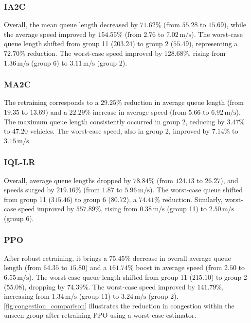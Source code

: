 \documentclass[lettersize,journal]{IEEEtran}
\begin{document}
\subsubsection{IA2C}
Overall, the mean queue length decreased by $71.62\%$ (from $55.28$ to $15.69$), while the average speed improved by $154.55\%$ (from $2.76$ to $7.02\,\mathrm{m/s}$). The worst-case queue length shifted from group 11 ($203.24$) to group 2 ($55.49$), representing a $72.70\%$ reduction. The worst-case speed improved by $128.68\%$, rising from $1.36\,\mathrm{m/s}$ (group 6) to $3.11\,\mathrm{m/s}$ (group 2).

\subsubsection{MA2C}
The retraining corresponds to a $29.25\%$ reduction in average queue length (from $19.35$ to $13.69$) and a $22.29\%$ increase in average speed (from $5.66$ to $6.92\,\mathrm{m/s}$). The maximum queue length consistently occurred in group 2, reducing by $3.47\%$ to $47.20$ vehicles. The worst-case speed, also in group 2, improved by $7.14\%$ to $3.15\,\mathrm{m/s}$.


\subsubsection{IQL-LR}
Overall, average queue lengths dropped by $78.84\%$ (from $124.13$ to $26.27$), and speeds surged by $219.16\%$ (from $1.87$ to $5.96\,\mathrm{m/s}$). The worst-case queue shifted from group 11 ($315.46$) to group 6 ($80.72$), a $74.41\%$ reduction. Similarly, worst-case speed improved by $557.89\%$, rising from $0.38\,\mathrm{m/s}$ (group 11) to $2.50\,\mathrm{m/s}$ (group 6). 

\subsubsection{PPO}
After robust retraining, it brings a $75.45\%$ decrease in overall average queue length (from $64.35$ to $15.80$) and a $161.74\%$ boost in average speed (from $2.50$ to $6.55\,\mathrm{m/s}$). The worst-case queue length shifted from group 11 ($215.10$) to group 2 ($55.08$), dropping by $74.39\%$. The worst-case speed improved by $141.79\%$, increasing from $1.34\,\mathrm{m/s}$ (group 11) to $3.24\,\mathrm{m/s}$ (group 2). \cref{fig:congestion_comparison} illustrates the reduction in congestion within the unseen group after retraining PPO using a worst-case estimator.
\end{document}
